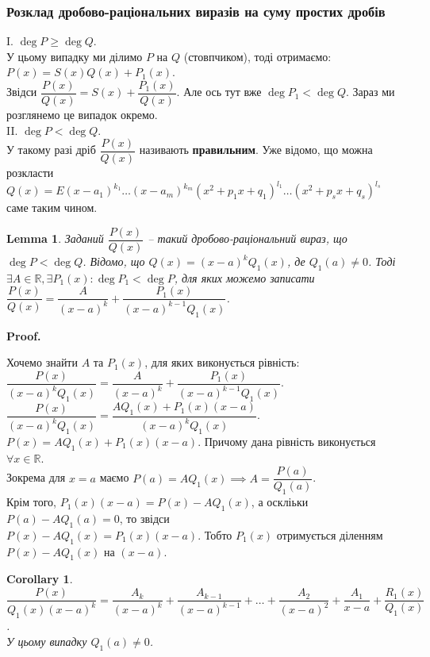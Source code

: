 \documentclass[a4paper, 10pt]{extarticle}
\makeatletter
\def\qed{$\blacksquare$}
\def\qed{$\blacksquare$}
\theoremstyle{theoremdd}
\theoremstyle{theoremdd}
\theoremstyle{theoremdd}
\theoremstyle{theoremdd}
\theoremstyle{theoremdd}
\theoremstyle{theoremdd}
\theoremstyle{theoremdd}
\newtheorem{lemma}[theorem]{Lemma}
\theoremstyle{theoremdd}
\newtheorem{corollary}[theorem]{Corollary}
\renewenvironment{proof}[1][Proof.\\]{\par
\pushQED{\hfill \qed}%
\normalfont \topsep6\p@\@plus6\p@\relax
\trivlist
\item\relax
{\bfseries
#1\@addpunct{.}}\hspace\labelsep\ignorespaces
}{%
\popQED\endtrivlist\@endpefalse
}
\makeatother
\begin{document}
\subsubsection*{Розклад дробово-раціональних виразів на суму простих дробів}
I. $\deg P \geq \deg Q$.\\
У цьому випадку ми ділимо $P$ на $Q$ (стовпчиком), тоді отримаємо:\\
$P(x) = S(x)Q(x) + P_1(x)$.\\
Звідси $\dfrac{P(x)}{Q(x)} = S(x) + \dfrac{P_1(x)}{Q(x)}$. Але ось тут вже $\deg P_1  < \deg Q$. Зараз ми розглянемо це випадок окремо.
\bigskip \\
II. $\deg P < \deg Q$.\\
У такому разі дріб $\dfrac{P(x)}{Q(x)}$ називають \textbf{правильним}.
Уже відомо, що можна розкласти $Q(x) = E(x-a_1)^{k_1} \dots (x-a_m)^{k_m} (x^2+p_1x+q_1)^{l_1} \dots (x^2+p_s x+q_s)^{l_s}$ саме таким чином.

\begin{lemma}
Заданий $\dfrac{P(x)}{Q(x)}$ -- такий дробово-раціональний вираз, що $\deg P < \deg Q$. Відомо, що $Q(x) = (x-a)^k Q_1(x)$, де $Q_1(a) \neq 0$. Тоді $\exists A \in \mathbb{R}, \exists P_1(x): \deg P_1 < \deg P$, для яких можемо записати\\
$\dfrac{P(x)}{Q(x)} = \dfrac{A}{(x-a)^k} + \dfrac{P_1(x)}{(x-a)^{k-1}Q_1(x)}$.
\end{lemma}

\begin{proof}
Хочемо знайти $A$ та $P_1(x)$, для яких виконується рівність:\\
$\dfrac{P(x)}{(x-a)^kQ_1(x)} = \dfrac{A}{(x-a)^k} + \dfrac{P_1(x)}{(x-a)^{k-1}Q_1(x)}$.\\
$\dfrac{P(x)}{(x-a)^k Q_1(x)} = \dfrac{AQ_1(x)+P_1(x)(x-a)}{(x-a)^kQ_1(x)}$.\\
$P(x) = AQ_1(x) + P_1(x)(x-a)$. Причому дана рівність виконується $\forall x \in \mathbb{R}$.\\
Зокрема для $x=a$ маємо $P(a) = AQ_1(x) \implies A = \dfrac{P(a)}{Q_1(a)}$.\\
Крім того, $P_1(x)(x-a) = P(x) - AQ_1(x)$, а оскліьки $P(a) - AQ_1(a) = 0$, то звідси \\
$P(x) -AQ_1(x) = P_1(x)(x-a)$. Тобто $P_1(x)$ отримується діленням $P(x)-AQ_1(x)$ на $(x-a)$.
\end{proof}

\begin{corollary}
$\dfrac{P(x)}{Q_1(x)(x-a)^k} = \dfrac{A_k}{(x-a)^k} + \dfrac{A_{k-1}}{(x-a)^{k-1}} + \dots + \dfrac{A_2}{(x-a)^2} + \dfrac{A_1}{x-a} + \dfrac{R_1(x)}{Q_1(x)}$.\\
У цьому випадку $Q_1(a) \neq 0$.
\end{corollary}
\end{document}

